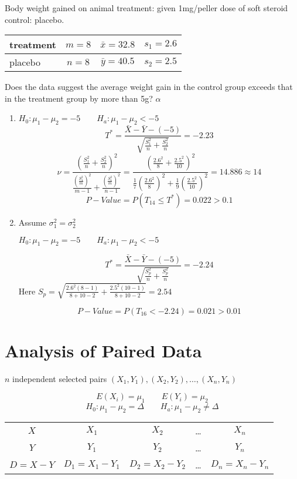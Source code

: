 \begin{exmp}
Body weight gained on animal treatment: given 1mg/peller dose of soft steroid control: placebo.

\begin{tabular}{l|c|c|c}
\hline
treatment & $m=8$ & $\bar{x}=32.8$ & $s_1=2.6$ \\
\hline
placebo & $n=8$ & $\bar{y}=40.5$ & $s_2=2.5$ \\
\hline
\end{tabular}

Does the data suggest the average weight gain in the control group exceeds that in the treatment group by more than 5g? $\alpha$

\begin{enumerate}
\item $H_0:\mu_1-\mu_2 = -5 \qquad H_a:\mu_1-\mu_2 < -5$
\[T^*=\frac{\bar{X}-\bar{Y}-(-5)}{\sqrt{\frac{S_1^2}{n}+\frac{S_2^2}{n}}}=-2.23 \]
\[\nu=\frac{\left( \frac{S_1^2}{n}+\frac{S_2^2}{n} \right)^2}{ \frac{\left( \frac{S_1^2}{m} \right)^2}{m-1}+ \frac{\left( \frac{S_1^2}{m} \right)^2}{n-1}  }=\frac{\left(\frac{2.6^2}{8}+\frac{2.5^2}{10}\right)^2}{\frac{1}{7} \left(\frac{2.6^2}{8}\right)^2+\frac{1}{9} \left(\frac{2.5^2}{10}\right)^2}=14.886 \approx 14\]
\[P-Value=P(T_{14}\leq T^*)=0.022>0.1\]
\item Assume $\sigma_1^2=\sigma_2^2$

$H_0:\mu_1-\mu_2 = -5 \qquad H_a:\mu_1-\mu_2 < -5$

\[T^*=\frac{\bar{X}-\bar{Y}-(-5)}{\sqrt{\frac{S_p^2}{n}+\frac{S_p^2}{n}}}=-2.24\]
Here $S_p=\sqrt{\frac{2.6^2 (8-1)}{8+10-2}+\frac{2.5^2 (10-1)}{8+10-2}}=2.54$

\[P-Value=P(T_{16}<-2.24)=0.021>0.01\]

\end{enumerate}
\end{exmp}

\section{Analysis of Paired Data}
$n$ independent selected pairs
$(X_1,Y_1),(X_2,Y_2),\dots,(X_n,Y_n)$

\[E(X_i)=\mu_1 \qquad E(Y_i)=\mu_2\]
\[H_0:\mu_1-\mu_2=\Delta \qquad H_a:\mu_1-\mu_2 \neq\Delta\]
\begin{center}
\begin{tabular}{ccccc}
\hline
$X$ & $X_1$ & $X_2$ & \dots & $X_n$ \\ 
$Y$ & $Y_1$ & $Y_2$ & \dots & $Y_n$ \\ 
$D=X-Y$ & $D_1=X_1-Y_1$ & $D_2=X_2-Y_2$ & \dots & $D_n=X_n-Y_n$ \\
\hline
\end{tabular}
\end{center}

